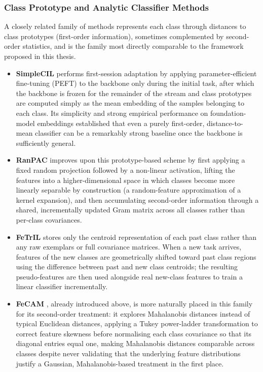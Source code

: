 \subsubsection{Class Prototype and Analytic Classifier Methods}
\label{sec:marco:prototype_methods}
A closely related family of methods represents each class through distances to class prototypes (first-order information), sometimes complemented by second-order statistics, and is the family most directly comparable to the framework proposed in this thesis.
\begin{itemize}
	\item \textbf{SimpleCIL} \cite{janson2022simple} performs first-session adaptation by applying parameter-efficient fine-tuning (PEFT) to the backbone only during the initial task, after which the backbone is frozen for the remainder of the stream and class prototypes are computed simply as the mean embedding of the samples belonging to each class. Its simplicity and strong empirical performance on foundation-model embeddings established that even a purely first-order, distance-to-mean classifier can be a remarkably strong baseline once the backbone is sufficiently general.
	\item \textbf{RanPAC} \cite{mcdonnell2023ranpac} improves upon this prototype-based scheme by first applying a fixed random projection followed by a non-linear activation, lifting the features into a higher-dimensional space in which classes become more linearly separable by construction (a random-feature approximation of a kernel expansion), and then accumulating second-order information through a shared, incrementally updated Gram matrix across all classes rather than per-class covariances.
	\item \textbf{FeTrIL} \cite{petit2023fetril} stores only the centroid representation of each past class rather than any raw exemplars or full covariance matrices. When a new task arrives, features of the new classes are geometrically shifted toward past class regions using the difference between past and new class centroids; the resulting pseudo-features are then used alongside real new-class features to train a linear classifier incrementally.
	\item \textbf{FeCAM} \cite{goswami2024fecam}, already introduced above, is more naturally placed in this family for its second-order treatment: it explores Mahalanobis distances instead of typical Euclidean distances, applying a Tukey power-ladder transformation to correct feature skewness before normalising each class covariance so that its diagonal entries equal one, making Mahalanobis distances comparable across classes despite never validating that the underlying feature distributions justify a Gaussian, Mahalanobis-based treatment in the first place.
\end{itemize}

